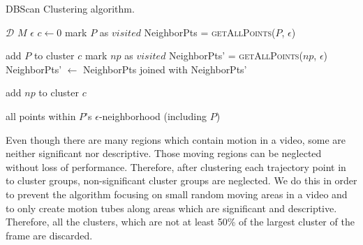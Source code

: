 \begin{algorithm}
 \caption{DBScan Clustering algorithm.}
   \label{alg:Clustering algorithm}
    \begin{algorithmic}[1]
    \Require  $\mathcal{D}$ 
    \Require $M$ 
    \Require $\epsilon$ 
        \State $c \leftarrow 0$ 
	  \EndIf
            \State mark $P$ as $visited$
            \State NeighborPts = \textsc{getAllPoints}($P$, $\epsilon$)
          \Else
          \EndIf
        \EndFor

	\State add $P$ to cluster $c$
	    \State mark $np$ as $visited$
	    \State NeighborPts' = \textsc{getAllPoints}($np$, $\epsilon$)
            \State NeighborPts' $\leftarrow$ NeighborPts joined with NeighborPts'
            \EndIf
	
	  \EndIf
         \State add $np$ to cluster $c$
         \EndIf
	\EndFor
       \EndFunction

       \Return all points within $P$'s $\epsilon$-neighborhood (including $P$)
       \EndFunction
\end{algorithmic}

\end{algorithm}


Even though there are many regions which contain motion in a video, some are neither significant nor descriptive.
Those moving regions can be neglected without loss of performance. Therefore, after clustering each trajectory point in to cluster groups,
non-significant cluster groups are neglected.
We do this in order to prevent the algorithm focusing on small random moving areas in a video and to only create motion tubes along areas which are significant and descriptive.
Therefore, all the clusters, which are not at least 50\% of the largest cluster of the frame are discarded.

